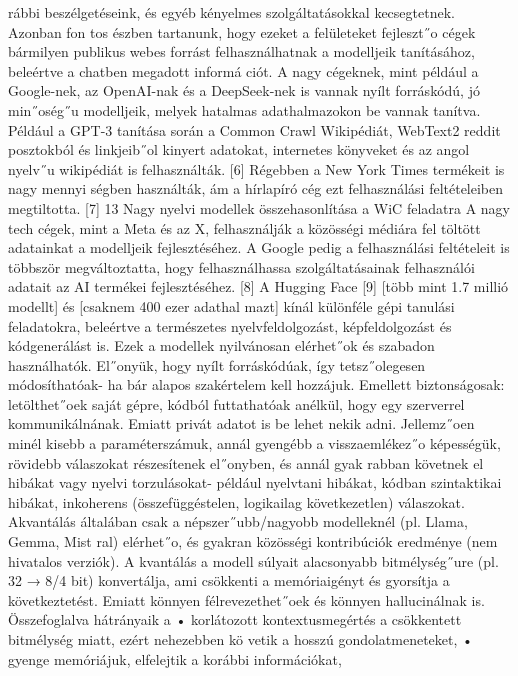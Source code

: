 \documentclass[12pt]{report}
\theoremstyle{definition}
\begin{document}
rábbi beszélgetéseink, és egyéb kényelmes szolgáltatásokkal kecsegtetnek. Azonban fon
tos észben tartanunk, hogy ezeket a felületeket fejleszt˝o cégek bármilyen publikus webes
 forrást felhasználhatnak a modelljeik tanításához, beleértve a chatben megadott informá
ciót. A nagy cégeknek, mint például a Google-nek, az OpenAI-nak és a DeepSeek-nek
 is vannak nyílt forráskódú, jó min˝oség˝u modelljeik, melyek hatalmas adathalmazokon be
 vannak tanítva. Például a GPT-3 tanítása során a Common Crawl Wikipédiát, WebText2
 reddit posztokból és linkjeib˝ol kinyert adatokat, internetes könyveket és az angol nyelv˝u
 wikipédiát is felhasználták. [6] Régebben a New York Times termékeit is nagy mennyi
ségben használták, ám a hírlapíró cég ezt felhasználási feltételeiben megtiltotta. [7]
 13
Nagy nyelvi modellek összehasonlítása a WiC feladatra
 A nagy tech cégek, mint a Meta és az X, felhasználják a közösségi médiára fel
töltött adatainkat a modelljeik fejlesztéséhez. A Google pedig a felhasználási feltételeit
 is többször megváltoztatta, hogy felhasználhassa szolgáltatásainak felhasználói adatait az
 AI termékei fejlesztéséhez. [8]
 A Hugging Face [9] [több mint 1.7 millió modellt] és [csaknem 400 ezer adathal
mazt] kínál különféle gépi tanulási feladatokra, beleértve a természetes nyelvfeldolgozást,
 képfeldolgozást és kódgenerálást is. Ezek a modellek nyilvánosan elérhet˝ok és szabadon
 használhatók. El˝onyük, hogy nyílt forráskódúak, így tetsz˝olegesen módosíthatóak- ha
bár alapos szakértelem kell hozzájuk. Emellett biztonságosak: letölthet˝oek saját gépre,
 kódból futtathatóak anélkül, hogy egy szerverrel kommunikálnának. Emiatt privát adatot
 is be lehet nekik adni. Jellemz˝oen minél kisebb a paraméterszámuk, annál gyengébb a
 visszaemlékez˝o képességük, rövidebb válaszokat részesítenek el˝onyben, és annál gyak
rabban követnek el hibákat vagy nyelvi torzulásokat- például nyelvtani hibákat, kódban
 szintaktikai hibákat, inkoherens (összefüggéstelen, logikailag következetlen) válaszokat.
 Akvantálás általában csak a népszer˝ubb/nagyobb modelleknél (pl. Llama, Gemma, Mist
ral) elérhet˝o, és gyakran közösségi kontribúciók eredménye (nem hivatalos verziók). A
 kvantálás a modell súlyait alacsonyabb bitmélység˝ure (pl. 32 → 8/4 bit) konvertálja, ami
 csökkenti a memóriaigényt és gyorsítja a következtetést. Emiatt könnyen félrevezethet˝oek
 és könnyen hallucinálnak is. Összefoglalva hátrányaik a
 • korlátozott kontextusmegértés a csökkentett bitmélység miatt, ezért nehezebben kö
vetik a hosszú gondolatmeneteket,
 • gyenge memóriájuk, elfelejtik a korábbi információkat,
\end{document}
